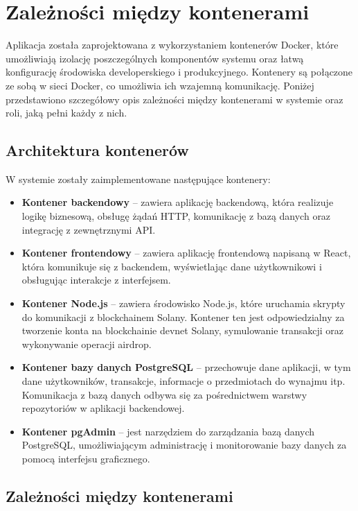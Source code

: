 \section{Zależności między kontenerami}

Aplikacja została zaprojektowana z wykorzystaniem kontenerów Docker, które umożliwiają izolację poszczególnych komponentów systemu oraz łatwą konfigurację środowiska developerskiego i produkcyjnego. Kontenery są połączone ze sobą w sieci Docker, co umożliwia ich wzajemną komunikację. Poniżej przedstawiono szczegółowy opis zależności między kontenerami w systemie oraz roli, jaką pełni każdy z nich.

\subsection{Architektura kontenerów}

W systemie zostały zaimplementowane następujące kontenery:

\begin{itemize}
    \item \textbf{Kontener backendowy} – zawiera aplikację backendową, która realizuje logikę biznesową, obsługę żądań HTTP, komunikację z bazą danych oraz integrację z zewnętrznymi API.
    \item \textbf{Kontener frontendowy} – zawiera aplikację frontendową napisaną w React, która komunikuje się z backendem, wyświetlając dane użytkownikowi i obsługując interakcje z interfejsem.
    \item \textbf{Kontener Node.js} – zawiera środowisko Node.js, które uruchamia skrypty do komunikacji z blockchainem Solany. Kontener ten jest odpowiedzialny za tworzenie konta na blockchainie devnet Solany, symulowanie transakcji oraz wykonywanie operacji airdrop.
    \item \textbf{Kontener bazy danych PostgreSQL} – przechowuje dane aplikacji, w tym dane użytkowników, transakcje, informacje o przedmiotach do wynajmu itp. Komunikacja z bazą danych odbywa się za pośrednictwem warstwy repozytoriów w aplikacji backendowej.
    \item \textbf{Kontener pgAdmin} – jest narzędziem do zarządzania bazą danych PostgreSQL, umożliwiającym administrację i monitorowanie bazy danych za pomocą interfejsu graficznego.
\end{itemize}

\subsection{Zależności między kontenerami}

